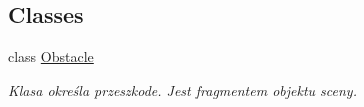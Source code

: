 \subsection*{Classes}
\begin{DoxyCompactItemize}
\item 
class \hyperlink{class_obstacle}{Obstacle}
\begin{DoxyCompactList}\small\item\em Klasa określa przeszkode. Jest fragmentem objektu sceny. \end{DoxyCompactList}\end{DoxyCompactItemize}
